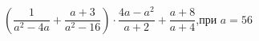 \begin{ex}[type=simplify_calculate]
	\begin{condition}
		\( \left( \dfrac{1}{a^2-4a}+\dfrac{a+3}{a^2-16} \right)\cdot\dfrac{4a-a^2}{a+2}+\dfrac{a+8}{a+4} \),\quad при \( a=56 \)
	\end{condition}
\end{ex}